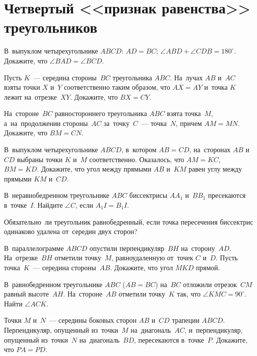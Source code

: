 
\section*{Четвертый <<признак равенства>> треугольников}



\begin{problems}

\item
В~выпуклом четырехугольнике $ABCD$:
$AD = BC$; $\angle ABD + \angle CDB = 180^{\circ}$.
Докажите, что $\angle BAD = \angle BCD$.

\item
Пусть $K$~--- середина стороны~$BC$ треугольника $ABC$.
На~лучах $AB$ и~$AC$ взяты точки $X$ и~$Y$ соответственно таким образом, что
$AX = AY$ и~точка $K$ лежит на~отрезке~$XY$.
Докажите, что $BX = CY$.

\item
На~стороне~$BC$ равностороннего треугольника $ABC$ взята точка~$M$,
а~на~продолжении стороны~$AC$ за~точку~$C$~--- точка~$N$, причем $AM = MN$.
Докажите, что $BM = CN$.

\item
В~выпуклом четырехугольнике $ABCD$, в~котором $AB = CD$, на~сторонах $AB$
и~$CD$ выбраны точки $K$ и~$M$ соответственно.
Оказалось, что $AM = KC$, $BM = KD$.
Докажите, что угол между прямыми $AB$ и~$KM$ равен углу между
прямыми $KM$ и~$CD$.

\item
В~неравнобедренном треугольнике $ABC$ биссектрисы $A A_1$ и~$B B_1$ пресекаются
в~точке~$I$.
Найдите $\angle C$, если $A_1 I = B_1 I$.

\item
Обязательно~ли треугольник равнобедренный, если точка пересечения биссектрис
одинаково удалена от~середин двух сторон?

\item
В~параллелограмме $ABCD$ опустили перпендикуляр~$BH$ на~сторону~$AD$.
На~отрезке~$BH$ отметили точку~$M$, равноудаленную от~точек $C$ и~$D$.
Пусть точка~$K$~--- середина стороны~$AB$.
Докажите, что угол $MKD$ прямой.

\item
В~равнобедренном треугольнике $ABC$ ($AB = BC$) на~$BC$ отложили отрезок~$CM$
равный высоте~$AH$.
На~стороне~$AB$ отметили точку~$K$ так, что $\angle KMC = 90^{\circ}$.
Найти $\angle ACK$.

\item
Точки $M$ и~$N$~--- середины боковых сторон $AB$ и~$CD$ трапеции $ABCD$.
Перпендикуляр, опущенный из~точки~$M$ на~диагональ~$AC$, и~перпендикуляр,
опущенный из~точки~$N$ на~диагональ~$BD$, пересекаются в~точке~$P$.
Докажите, что $PA = PD$.

\end{problems}


